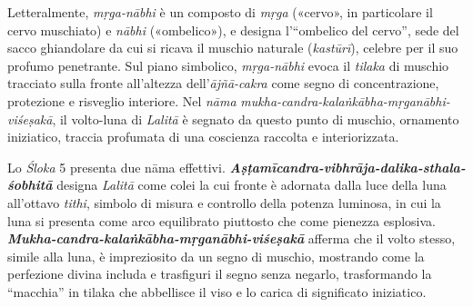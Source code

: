Letteralmente, \textit{mṛga-nābhi} è un composto di \textit{mṛga} («cervo», in particolare il cervo muschiato) e \textit{nābhi} («ombelico»), e designa l’“ombelico del cervo”, sede del sacco ghiandolare da cui si ricava il muschio naturale (\textit{kastūrī}), celebre per il suo profumo penetrante. Sul piano simbolico, \textit{mṛga-nābhi} evoca il \textit{tilaka} di muschio tracciato sulla fronte all’altezza dell’\textit{ājñā-cakra} come segno di concentrazione, protezione e risveglio interiore. Nel \textit{nāma} \textit{mukha-candra-kalaṅkābha-mṛganābhi-viśeṣakā}, il volto-luna di \textit{Lalitā} è segnato da questo punto di muschio, ornamento iniziatico, traccia profumata di una coscienza raccolta e interiorizzata.

Lo \textit{Śloka} 5 presenta due nāma effettivi. \textbf{\textit{Aṣṭamīcandra-vibhrāja-dalika-sthala-śobhitā}} designa \textit{Lalitā} come colei la cui fronte è adornata dalla luce della luna all’ottavo \textit{tithi}, simbolo di misura e controllo della potenza luminosa, in cui la luna si presenta come arco equilibrato piuttosto che come pienezza esplosiva. \textbf{\textit{Mukha-candra-kalaṅkābha-mṛganābhi-viśeṣakā}} afferma che il volto stesso, simile alla luna, è impreziosito da un segno di muschio, mostrando come la perfezione divina includa e trasfiguri il segno senza negarlo, trasformando la “macchia” in tilaka che abbellisce il viso e lo carica di significato iniziatico.
​